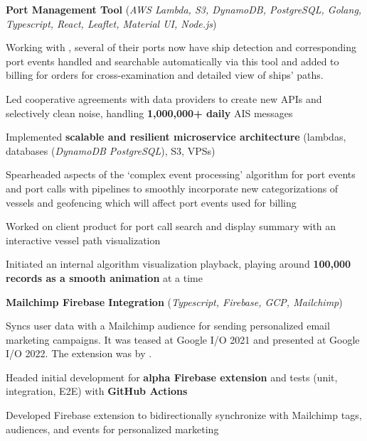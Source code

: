 \begin{cventries}
  \cvcustombodydescription
      {\textbf{Port Management Tool} (\emph{AWS Lambda, S3, DynamoDB, PostgreSQL, Golang, Typescript, React, Leaflet, Material UI, Node.js})}
      {
      \begin{cvtightprose} %
        {Working with , several of their ports now have ship detection and corresponding port events handled and searchable automatically via this tool and added to billing for  orders for cross-examination and detailed view of ships' paths.}
      \end{cvtightprose}
      }
      {
      \begin{cvitems} %
        \item {Led cooperative agreements with data providers to create new APIs and selectively clean noise, handling \textbf{1,000,000+ daily} AIS messages}
        \item {Implemented \textbf{scalable and resilient microservice architecture} (lambdas, databases (\emph{DynamoDB \rightarrow PostgreSQL}), S3, VPSs)}
        \item {Spearheaded aspects of the `complex event processing' algorithm for port events and port calls with pipelines to smoothly incorporate new categorizations of vessels and geofencing which will affect port events used for billing}
        \item {Worked on client product for port call search and display summary with an interactive vessel path visualization}
        \item {Initiated an internal algorithm visualization playback, playing around \textbf{100,000 records as a smooth animation} at a time}
      \end{cvitems}
    }

  \cvcustombodydescription
      {\textbf{Mailchimp Firebase Integration} (\emph{Typescript, Firebase, GCP, Mailchimp})}
      {
      \begin{cvtightprose} %
        {Syncs user data with a Mailchimp audience for sending personalized email marketing campaigns. It was teased at Google I/O 2021 and presented at Google I/O 2022. The extension was  by .}
      \end{cvtightprose}
      }
      {
      \begin{cvitems} %
        \item {Headed initial development for \textbf{alpha Firebase extension} and tests (unit, integration, E2E) with \textbf{GitHub Actions}}
        \item {Developed Firebase extension to bidirectionally synchronize with Mailchimp tags, audiences, and events for personalized marketing}
      \end{cvitems}
    }

\end{cventries}
